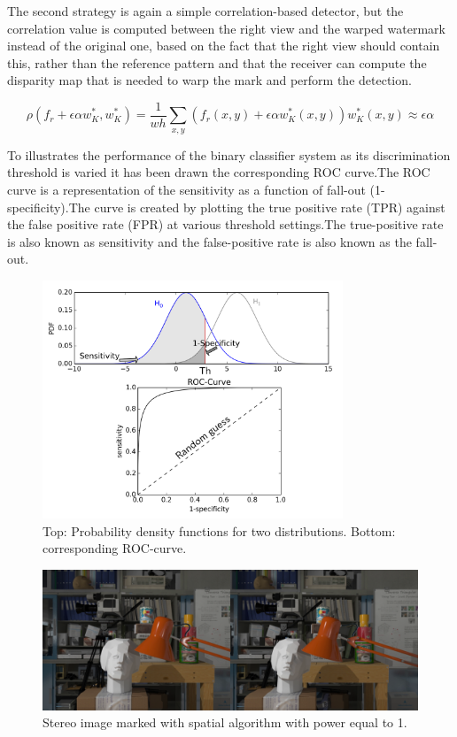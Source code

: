 The second strategy is again a simple correlation-based detector, but the correlation value is computed between the right view and the warped watermark instead of the original one, based on the fact that the right view should contain this, rather than the reference pattern and that the receiver can compute the disparity map that is needed to warp the mark and perform the detection.

$$\rho(f_{r}+\epsilon\alpha w_{K}^{*},w_{K}^{*})= \frac{1}{wh}\sum_{x,y}(f_{r}(x,y)+\epsilon\alpha w_{K}^{*}(x,y))w_{K}^{*}(x,y)\approx\epsilon\alpha $$

To illustrates the performance of the binary classifier system as its discrimination threshold is varied it has been drawn the corresponding ROC curve.\newline  The ROC curve is a representation of the sensitivity as a function of fall-out (1-specificity).\newline  The curve is created by plotting the true positive rate (TPR) against the false positive rate (FPR) at various threshold settings.\newline The true-positive rate is also known as sensitivity and the false-positive rate is also known as the fall-out.\newline  

\begin{figure}[h!]
\centering
\includegraphics[width=0.8\textwidth]{./img/roc.png}
\caption{\small{Top: Probability density functions for two distributions. Bottom: corresponding ROC-curve.}}
\label{fig:roc}
\end{figure}

\begin{figure}[h!]
\centering
\includegraphics[width=1\textwidth]{./img/marked_1_gauss.png}
\caption{\small{Stereo image marked with spatial algorithm with power equal to 1.}}
\label{fig:gauss1}
\end{figure}

